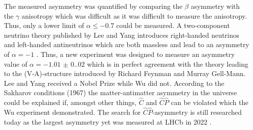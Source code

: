 The measured asymmetry was quantified by comparing the $\beta$ asymmetry with the $\gamma$ anisotropy which was difficult as it was difficult to measure the anisotropy.
Thus, only a lower limit of $\alpha\leq -0.7$ could be measured.
A two-component neutrino theory published by Lee and Yang introduces right-handed neutrinos and left-handed antineutrinos which are both massless and lead to an asymmetry of $\alpha=-1$ \cite{PhysRev.105.1671}.
Thus, a new experiment was designed to measure an asymmetry value of $\alpha=\num{-1.01(0.02)}$ which is in perfect agreement with the theory leading to the (V-A)-structure introduced by Richard Feynman and Murray Gell-Mann.
Lee and Yang received a Nobel Prize while Wu did not.
According to the Sakharov conditions (1967) \cite{Gato-Rivera} the matter-antimatter asymmetry in the universe could be explained if, amongst other things, $\hat C$ and $\hat C\hat P$ can be violated which the Wu experiment demonstrated.
The search for $\hat C\hat P$-asymmetry is still researched today as the largest asymmetry yet was measured at LHCb in 2022 \cite{AntiSymmetryLHC}.